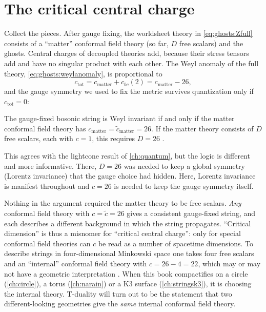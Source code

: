 \section{The critical central charge}\label{sec:ghosts:critical}

Collect the pieces. After gauge fixing, the worldsheet theory in \cref{eq:ghosts:Zfull} consists
of a ``matter'' conformal field theory (so far, $D$ free scalars) and the ghosts. Central
charges of decoupled theories add, because their stress tensors add and have no singular
product with each other. The Weyl anomaly of the full theory, \cref{eq:ghosts:weylanomaly}, is
proportional to
\begin{equation}\label{eq:ghosts:ctot}
  c_{\mathrm{tot}}=c_{\mathrm{matter}}+c_{bc}(2)=c_{\mathrm{matter}}-26 ,
\end{equation}
and the gauge symmetry we used to fix the metric survives quantization only if
$c_{\mathrm{tot}}=0$:

\begin{proposition}\label{prop:ghosts:26}
The gauge-fixed bosonic string is Weyl invariant if and only if the matter conformal field
theory has $c_{\mathrm{matter}}=\tilde c_{\mathrm{matter}}=26$. If the matter theory consists
of $D$ free scalars, each with $c=1$, this requires $D=26$
.
\end{proposition}

This agrees with the lightcone result of \cref{ch:quantum}, but the logic is different and
more informative. There, $D=26$ was needed to keep a global symmetry (Lorentz invariance)
that the gauge choice had hidden. Here, Lorentz invariance is manifest throughout and
$c=26$ is needed to keep the gauge symmetry itself.

\begin{physicsbox}
Nothing in the argument required the matter theory to be free scalars. \emph{Any} conformal
field theory with $c=\tilde c=26$ gives a consistent gauge-fixed string, and each describes a
different background in which the string propagates. ``Critical dimension'' is thus a
misnomer for ``critical central charge'': only for special conformal field theories can $c$
be read as a number of spacetime dimensions. To describe strings in four-dimensional
Minkowski space one takes four free scalars and an ``internal'' conformal field theory with
$c=26-4=22$, which may or may not have a geometric interpretation
. When this book compactifies on a circle
(\cref{ch:circle}), a torus (\cref{ch:narain}) or a K3 surface (\cref{ch:stringsk3}), it is
choosing the internal theory. T-duality will turn out to be the statement that two
different-looking geometries give the \emph{same} internal conformal field theory.
\end{physicsbox}

